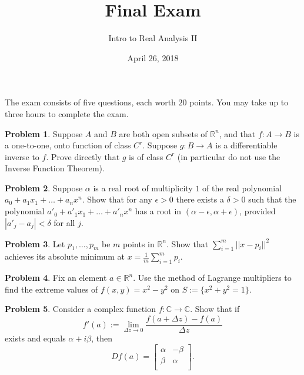 \documentclass{amsart}
\newcommand{\+}[1]{\ensuremath{\mathbf{#1}}}
\newcommand{\C}{{\mathbb C}}
\newcommand{\R}{{\mathbb R}}
\theoremstyle{definition}
\newtheorem{prob}{Problem}
\begin{document}
\title{Final Exam}
\date{April 26, 2018}
\author{Intro to Real Analysis II}

\maketitle


The exam consists of five questions, each worth $20$ points.
You may take up to three hours to complete the exam.

\vspace{5mm}

\begin{prob}
 Suppose $A$ and $B$ are both open subsets of $\R^n$,
 and that $f: A \to B$ is a one-to-one, onto
 function of class  $C^r$.
 Suppose $g: B \to A$ is a differentiable inverse to $f$.
 Prove directly that $g$ is of class $C^r$ (in particular do not use the Inverse Function Theorem).
\end{prob}

\vspace{5mm}


\begin{prob}
 Suppose $\alpha$ is a real root of multiplicity $1$ 
 of the real polynomial
 $a_0 + a_1x_1 + \ldots + a_n x^n$.
 Show that for any $\epsilon > 0$
 there exists a $\delta > 0$ such that
 the polynomial  $a'_0 + a'_1x_1 + \ldots + a'_n x^n$
 has a root in $(\alpha - \epsilon, \alpha + \epsilon)$,
 provided $|a'_j - a_j| < \delta$ for all $j$.
\end{prob}

\vspace{5mm}


\begin{prob}
Let $p_1, \ldots, p_m$ be $m$ points in $\R^n$.
Show that $\sum^{m}_{i=1} ||x - p_i||^2$
achieves its absolute minimum at $x = \frac{1}{m}\sum^m_{i=1} p_i$.
\end{prob}

\vspace{5mm}


\begin{prob}
Fix an element $a \in \R^n$.
 Use the method of Lagrange multipliers to
find the extreme values of $f(x,y) = x^2 - y^2$
on $S := \{x^2 + y^2 = 1\}$.
\end{prob}

\vspace{5mm}


\begin{prob}
Consider a complex function $f: \C \to \C$.
 Show that if \[f'(a) := \lim_{\Delta z \to 0} \frac{f(a + \Delta z) - f(a)}{\Delta z}\] exists and equals $\alpha + i \beta$, then
 \[
 Df(a) = 
  \begin{bmatrix}
\alpha & -\beta \\ \beta & \alpha \\
\end{bmatrix}.
 \]
\end{prob}
\end{document}
